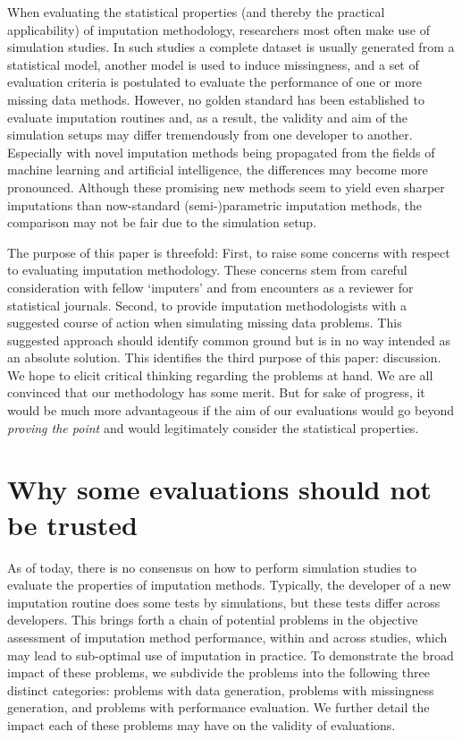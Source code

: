 \documentclass[bimj,fleqn]{w-art}
\begin{document}
When evaluating the statistical properties (and thereby the practical applicability) of imputation methodology, researchers most often make use of simulation studies. In such studies a complete dataset is usually generated from a statistical model, another model is used to induce missingness, and a set of evaluation criteria is postulated to evaluate the performance of one or more missing data methods. However, no golden standard has been established to evaluate imputation routines and, as a result, the validity and aim of the simulation setups may differ tremendously from one developer to another. Especially with novel imputation methods being propagated from the fields of machine learning and artificial intelligence, the differences may become more pronounced. Although these promising new methods seem to yield even sharper imputations than now-standard (semi-)parametric imputation methods, the comparison may not be fair due to the simulation setup. 

The purpose of this paper is threefold: First, to raise some concerns with respect to evaluating imputation methodology. These concerns stem from careful consideration with fellow `imputers' and from encounters as a reviewer for statistical journals. Second, to provide imputation methodologists with a suggested course of action when simulating missing data problems. This suggested approach should identify common ground but is in no way intended as an absolute solution. This identifies the third purpose of this paper: discussion. We hope to elicit critical thinking regarding the problems at hand. We are all convinced that our methodology has some merit. But for sake of progress, it would be much more advantageous if the aim of our evaluations would go beyond \textit{proving the point} and would legitimately consider the statistical properties. 



\section{Why some evaluations should not be trusted}

As of today, there is no consensus on how to perform simulation studies to evaluate the properties of imputation methods. Typically, the developer of a new imputation routine does some tests by simulations, but these tests differ across developers. This brings forth a chain of potential problems in the objective assessment of imputation method performance, within and across studies, which may lead to sub-optimal use of imputation in practice. To demonstrate the broad impact of these problems, we subdivide the problems into the following three distinct categories: problems with data generation, problems with missingness generation, and problems with performance evaluation. We further detail the impact each of these problems may have on the validity of evaluations. 
\end{document}
